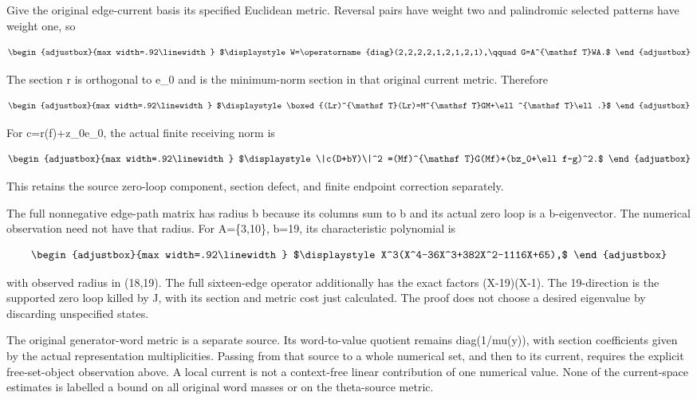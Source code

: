 Give the original edge-current basis its specified Euclidean metric. Reversal pairs have weight two and palindromic selected patterns have weight one, so

\[
\begin{adjustbox}{max width=.92\linewidth}
$\displaystyle W=\operatorname{diag}(2,2,2,2,1,2,1,2,1),\qquad G=A^{\mathsf T}WA.$
\end{adjustbox}
\]

The section r is orthogonal to e\_0 and is the minimum-norm section in that original current metric. Therefore

\[
\begin{adjustbox}{max width=.92\linewidth}
$\displaystyle \boxed{(Lr)^{\mathsf T}(Lr)=M^{\mathsf T}GM+\ell^{\mathsf T}\ell.}$
\end{adjustbox}
\]

For c=r(f)+z\_0e\_0, the actual finite receiving norm is

\[
\begin{adjustbox}{max width=.92\linewidth}
$\displaystyle \|c(D+bY)\|^2
=(Mf)^{\mathsf T}G(Mf)+(bz_0+\ell f-g)^2.$
\end{adjustbox}
\]

This retains the source zero-loop component, section defect, and finite endpoint correction separately.

The full nonnegative edge-path matrix has radius b because its columns sum to b and its actual zero loop is a b-eigenvector. The numerical observation need not have that radius. For A=\{3,10\}, b=19, its characteristic polynomial is

\[
\begin{adjustbox}{max width=.92\linewidth}
$\displaystyle X^3(X^4-36X^3+382X^2-1116X+65),$
\end{adjustbox}
\]

with observed radius in (18,19). The full sixteen-edge operator additionally has the exact factors (X-19)(X-1). The 19-direction is the supported zero loop killed by J, with its section and metric cost just calculated. The proof does not choose a desired eigenvalue by discarding unspecified states.

The original generator-word metric is a separate source. Its word-to-value quotient remains diag(1/mu(y)), with section coefficients given by the actual representation multiplicities. Passing from that source to a whole numerical set, and then to its current, requires the explicit free-set-object observation above. A local current is not a context-free linear contribution of one numerical value. None of the current-space estimates is labelled a bound on all original word masses or on the theta-source metric.

